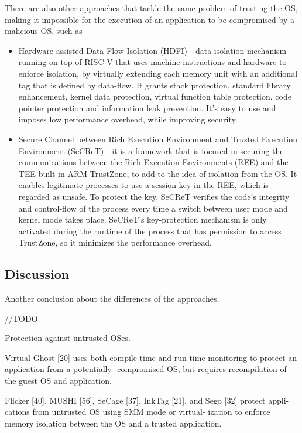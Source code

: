 There are also other approaches that tackle the same problem of trusting the OS, making it impossible for the execution of an  application to be compromised by a malicious OS, such as 

\begin{itemize}
	\item Hardware-assisted Data-Flow Isolation (HDFI) \cite{hdfiPaper} - data isolation mechanism running on top of RISC-V that uses machine instructions and hardware to enforce isolation, by virtually extending each memory unit with an additional tag that is defined by data-flow. It grants stack protection, standard library enhancement, kernel data protection, virtual function table protection, code pointer protection and information leak prevention. It's easy to use and imposes low performance overhead, while improving security.
	
	\item Secure Channel between Rich Execution Environment and Trusted Execution Environment (SeCReT) \cite{secretPaper} - it is a framework that is focused in securing the communications between the Rich Execution Environments (REE) and the TEE built in ARM TrustZone, to add to the idea of isolation from the OS. It enables legitimate processes to use a session key in the REE, which is regarded as unsafe. To protect the key, SeCReT verifies the code's integrity and control-flow of the process every time a switch between user mode and kernel mode takes place. SeCReT's key-protection mechanism is only activated during the runtime of the process that has permission to access TrustZone, so it minimizes the performance overhead.
	
	
\end{itemize}



\subsection{Discussion}
\label{ssec:tee_frameworks_discussion}

Another conclusion about the differences of the approaches. 
 
//TODO

Protection against untrusted OSes.

Virtual Ghost [20] uses both compile-time and run-time
monitoring to protect an application from a potentially-
compromised OS, but requires recompilation of the
guest OS and application.

Flicker [40], MUSHI [56],
SeCage [37], InkTag [21], and Sego [32] protect appli-
cations from untrusted OS using SMM mode or virtual-
ization to enforce memory isolation between the OS and
a trusted application.

